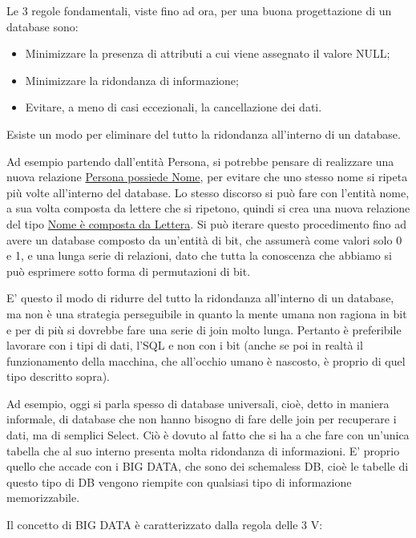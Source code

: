 Le 3 regole fondamentali, viste fino ad ora, per una buona progettazione di un database sono:

\begin{itemize}

\item Minimizzare la presenza di attributi a cui viene assegnato il valore NULL;
\item Minimizzare la ridondanza di informazione;
\item Evitare, a meno di casi eccezionali, la cancellazione dei dati. 

\end{itemize}

Esiste un modo per eliminare del tutto la ridondanza all’interno di un database. 

Ad esempio partendo dall’entità Persona, si potrebbe pensare di realizzare una nuova relazione \underline{Persona possiede Nome}, per evitare che uno stesso nome si ripeta più volte all’interno del database. Lo stesso discorso si può fare con l’entità nome, a sua volta composta da lettere che si ripetono, quindi si crea una nuova relazione del tipo \underline{Nome è composta da Lettera}. Si può iterare questo procedimento fino ad avere un database composto da un’entità di bit, che assumerà come valori solo 0 e 1, e una lunga serie di relazioni, dato che tutta la conoscenza che abbiamo si può esprimere sotto forma di permutazioni di bit. 

E’ questo il modo di ridurre del tutto la ridondanza all’interno di un database, ma non è una strategia perseguibile in quanto la mente umana non ragiona in bit e per di più 
si dovrebbe fare una serie di join molto lunga. Pertanto è preferibile lavorare con i tipi di dati, l’SQL e non con i bit (anche se poi in realtà il funzionamento della macchina, che all’occhio umano è nascosto, è proprio di quel tipo descritto sopra).  

Ad esempio, oggi si parla spesso di database universali, cioè, detto in maniera informale, di database che non hanno bisogno di fare delle join per recuperare i dati, ma di semplici Select. Ciò è dovuto al fatto che si ha a che fare con un’unica tabella che al suo interno presenta molta ridondanza di informazioni. 
E’ proprio quello che accade con i BIG DATA, che sono dei schemaless DB, cioè le tabelle di questo tipo di DB vengono riempite con qualsiasi tipo di informazione memorizzabile. 

Il concetto di BIG DATA è caratterizzato dalla regola delle 3 V:

